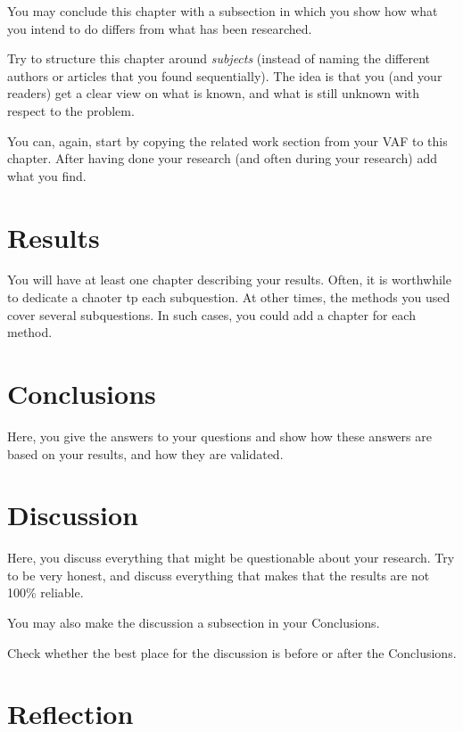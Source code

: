 \documentclass[oneside]{ou-report}
\begin{document}
You may conclude this chapter with a subsection in which you show how what you intend to do differs from what has been researched.

Try to structure this chapter around \emph{subjects} (instead of naming the different authors or articles that you found sequentially). The idea is that you (and your readers) get a clear view on what is known, and what is still unknown with respect to the problem.

You can, again, start by copying the related work section from your VAF to this chapter. After having done your research (and often during your research) add what you find.

\chapter{Results}
You will have at least one chapter describing your results. Often, it is worthwhile to dedicate a chaoter tp each subquestion. At other times, the methods you used cover several subquestions. In such cases, you could add a chapter for each method.

\chapter{Conclusions}

Here, you give the answers to your questions and show how these answers are based on your results, and how they are validated.

\chapter{Discussion}
Here, you discuss everything that might be questionable about your research. Try to be very honest, and discuss everything that makes that the results are not 100\% reliable.

You may also make the discussion a subsection in your Conclusions.

Check whether the best place for the discussion is before or after the Conclusions.

\backmatter

\chapter{Reflection}




\appendix
\end{document}

